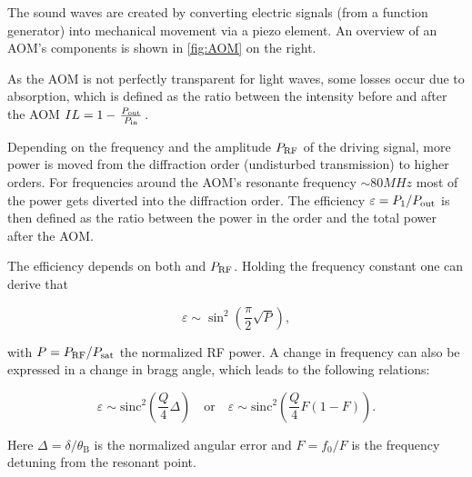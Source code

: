 The sound waves are created by converting electric signals (from a function generator) into mechanical movement via a piezo element. An overview of an AOM's components is shown in \autoref{fig:AOM} on the right. 

As the AOM is not perfectly transparent for light waves, some losses occur due to absorption, which is defined as the ratio between the intensity before and after the AOM \( IL = 1 - \tfrac{\P{out}}{\P{in}} \). 

Depending on the frequency \frf and the amplitude \( \P{RF} \) of the driving signal, more power is moved from the  diffraction order (undisturbed transmission) to higher orders. For frequencies around the AOM's resonante frequency \frf \( \sim 80 \unit{MHz} \) \autocite{datasheet} most of the power gets diverted into the  diffraction order. The efficiency \( \varepsilon = P_1/\P{out} \) is then defined as the ratio between the power in the  order and the total power after the AOM. 

The efficiency depends on both \frf and \( \P{RF} \). Holding the frequency \frf constant one can derive that 

\begin{equation}\label{eqn:epsilon2}
	\varepsilon \sim \sin^2\left(\frac{\pi}{2} \sqrt{P}\right),
\end{equation}

with \( P = \P{RF}/\P{sat} \) the normalized RF power. A change in frequency can also be expressed in a change in bragg angle, which leads to the following relations:

\begin{equation}\label{eqn:epsilon}
	\varepsilon \sim \mathrm{sinc}^2\left(\frac{Q}{4}\Delta\right) 
	\quad\text{or}\quad 
	\varepsilon \sim \mathrm{sinc}^2\left(\frac{Q}{4} F \left(1-F\right)\right).
\end{equation}

Here \( \Delta = \delta/\theta_\mathrm{B} \) is the normalized angular error and \( F = f_0/F \) is the frequency detuning from the resonant point. 

